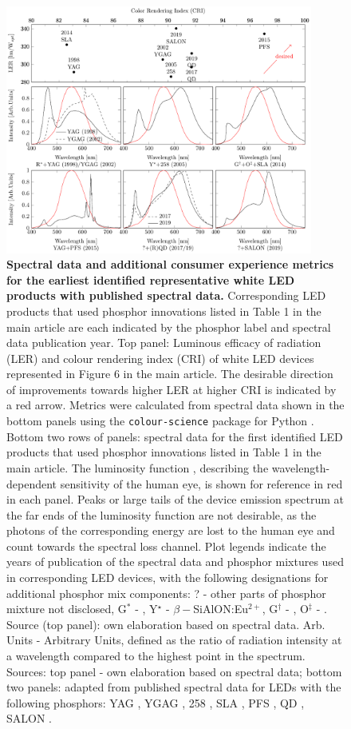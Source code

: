 \documentclass[parskip=full]{article}
\begin{document}
\begin{figure}[H]
	\centering
    \includegraphics[width=0.9\textwidth]{./figures/phosphor_spectrum-comparison.pdf}
	\caption{\textbf{Spectral data and additional consumer experience metrics for the earliest identified representative white LED products with published spectral data.} Corresponding LED products that used phosphor innovations listed in Table 1 in the main article are each indicated by the phosphor label and spectral data publication year. Top panel: Luminous efficacy of radiation (LER) and colour rendering index (CRI) of white LED devices represented in Figure 6 in the main article. The desirable direction of improvements towards higher LER at higher CRI is indicated by a red arrow. Metrics were calculated from spectral data shown in the bottom panels using the \texttt{colour-science} package for Python \cite{colour-science_software}. Bottom two rows of panels: spectral data for the first identified LED products that used phosphor innovations listed in Table 1 in the main article. The luminosity function \cite{cie-term-lumeff}, describing the wavelength-dependent sensitivity of the human eye, is shown for reference in red in each panel. Peaks or large tails of the device emission spectrum at the far ends of the luminosity function are not desirable, as the photons of the corresponding energy are lost to the human eye and count towards the spectral loss channel. Plot legends indicate the years of publication of the spectral data and phosphor mixtures used in corresponding LED devices, with the following designations for additional phosphor mix components: ? -  other parts of phosphor mixture not disclosed, G$^*$ - , Y$^\star$ - $\beta-$SiAlON:Eu$^{2+}$, G$^\dagger$ - , O$^\ddagger$ - . Source (top panel): own elaboration based on spectral data. Arb. Units - Arbitrary Units, defined as the ratio of radiation intensity at a wavelength compared to the highest point in the spectrum. Sources: top panel - own elaboration based on spectral data; bottom two panels: adapted from published spectral data for LEDs with the following phosphors: YAG \cite{bando1998development}, YGAG \cite{Mueller2002}, 258 \cite{MuellerMach2005}, SLA \cite{Pust2014}, PFS \cite{trigain_spectrum}, QD \cite{lumileds2016qd}\cite{osram2019qd}, SALON \cite{Hoerder2019}.}

\end{figure}
\end{document}
